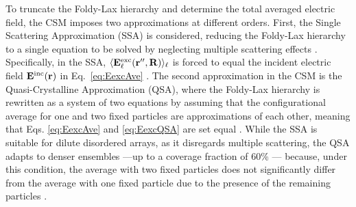 To truncate the Foldy-Lax hierarchy and determine the total averaged electric field, the CSM imposes two approximations at different orders. First, the Single Scattering Approximation (SSA) is considered, reducing the Foldy-Lax hierarchy to a single equation to be solved by neglecting multiple scattering effects \cite{barrera_coherent_2003}. Specifically, in the SSA, $\langle\vb{E}_\ell^\text{exc}(\vb{r}'',\vb{R})\rangle_\ell$ is forced to equal the incident electric field $\vb{E}^\text{inc}(\vb{r})$ in Eq.~\eqref{eq:EexcAve} \cite{loiko_monolayers_1998,garcia2012multiple}. The second approximation in the CSM is the Quasi-Crystalline Approximation (QSA), where the Foldy-Lax hierarchy is rewritten as a system of two equations by assuming that the configurational average for one and two fixed particles are approximations of each  other, meaning that Eqs. \eqref{eq:EexcAve} and \eqref{eq:EexcQSA} are set equal \cite{loiko_monolayers_1998,barrera_coherent_2003}. While the SSA is suitable for dilute disordered arrays, as it disregards multiple scattering, the QSA adapts to denser ensembles ---up to a coverage fraction of 60\% \cite{loiko_monolayers_1998}--- because, under this condition, the average with two fixed particles does not significantly differ from the average with one fixed particle due to the presence of the remaining particles \cite{barrera_coherent_2003}.


